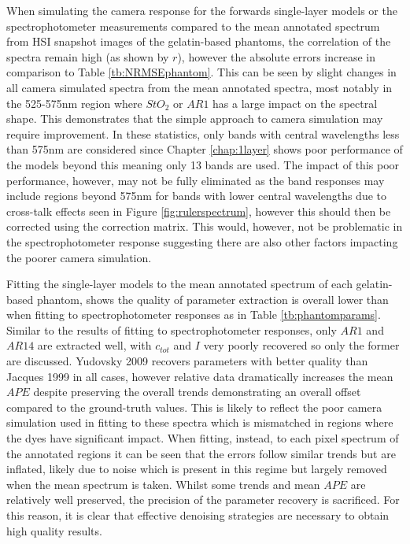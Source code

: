 When simulating the camera response for the forwards single-layer models or the spectrophotometer measurements compared to the mean annotated spectrum from HSI snapshot images of the gelatin-based phantoms, the correlation of the spectra remain high (as shown by $r$), however the absolute errors increase in comparison to Table \ref{tb:NRMSEphantom}. This can be seen by slight changes in all camera simulated spectra from the mean annotated spectra, most notably in the 525-575nm region where $StO_2$ or $AR1$ has a large impact on the spectral shape. This demonstrates that the simple approach to camera simulation may require improvement. In these statistics, only bands with central wavelengths less than 575nm are considered since Chapter \ref{chap:1layer} shows poor performance of the models beyond this meaning only 13 bands are used. The impact of this poor performance, however, may not be fully eliminated as the band responses may include regions beyond 575nm for bands with lower central wavelengths due to cross-talk effects seen in Figure \ref{fig:rulerspectrum}, however this should then be corrected using the correction matrix. This would, however, not be problematic in the spectrophotometer response suggesting there are also other factors impacting the poorer camera simulation. 

Fitting the single-layer models to the mean annotated spectrum of each gelatin-based phantom, shows the quality of parameter extraction is overall lower than when fitting to spectrophotometer responses as in Table \ref{tb:phantomparams}. Similar to the results of fitting to spectrophotometer responses, only $AR1$ and $AR14$ are extracted well, with $c_{tot}$ and $I$ very poorly recovered so only the former are discussed. Yudovsky 2009 recovers parameters with better quality than Jacques 1999 in all cases, however relative data dramatically increases the mean $APE$ despite preserving the overall trends demonstrating an overall offset compared to the ground-truth values. This is likely to reflect the poor camera simulation used in fitting to these spectra which is mismatched in regions where the dyes have significant impact. When fitting, instead, to each pixel spectrum of the annotated regions it can be seen that the errors follow similar trends but are inflated, likely due to noise which is present in this regime but largely removed when the mean spectrum is taken. Whilst some trends and mean $APE$ are relatively well preserved, the precision of the parameter recovery is sacrificed. For this reason, it is clear that effective denoising strategies are necessary to obtain high quality results. 

